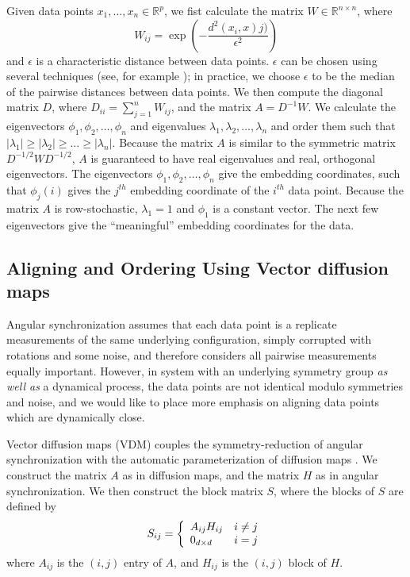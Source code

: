 \documentclass[12pt]{article}
\begin{document}
Given data points $x_1, \dots, x_n \in \mathbb{R}^p$, we fist calculate the matrix $W \in \mathbb{R}^{n \times n}$, where 
\begin{equation}
W_{ij} = \exp \left( -\frac{d^2(x_i, x)j)}{\epsilon^2} \right)
\end{equation}
and $\epsilon$ is a characteristic distance between data points.
%
$\epsilon$ can be chosen using several techniques (see, for example \cite{coifman2008graph}); in practice, we choose $\epsilon$ to be the median of the pairwise distances between data points.
%
We then compute the diagonal matrix $D$, where $D_{ii} = \sum_{j=1}^{n} W_{ij}$, and the matrix $A = D^{-1} W$. 
%
We calculate the eigenvectors $\phi_1, \phi_2, \dots, \phi_n$ and eigenvalues $\lambda_1, \lambda_2, \dots, \lambda_n$ and order them such that $|\lambda_1| \ge |\lambda_2| \ge \dots \ge |\lambda_n|$. 
%
Because the matrix $A$ is similar to the symmetric matrix $D^{-1/2} W D^{-1/2}$, $A$ is guaranteed to have real eigenvalues and real, orthogonal eigenvectors. 
%
The eigenvectors $\phi_1, \phi_2, \dots, \phi_n$ give the embedding coordinates, such that $\phi_j(i)$ gives the $j^{th}$ embedding coordinate of the $i^{th}$ data point. 
%
Because the matrix $A$ is row-stochastic, $\lambda_1=1$ and $\phi_1$ is a constant vector.
%
The next few eigenvectors give the ``meaningful'' embedding coordinates for the data. 

\subsection{Aligning and Ordering Using Vector diffusion maps} 

Angular synchronization assumes that each data point is a replicate measurements of the same underlying configuration, simply corrupted with rotations and some noise, and therefore considers all pairwise measurements equally important.
%
However, in system with an underlying symmetry group {\em as well as} a dynamical process, the data points are not identical modulo symmetries and noise, and we would like to place more emphasis on aligning data points which are dynamically close.

Vector diffusion maps (VDM) couples the symmetry-reduction of angular synchronization with the automatic parameterization of diffusion maps \cite{singer2012vector}. 
%
We construct the matrix $A$ as in diffusion maps, and the matrix $H$ as in angular synchronization.
%
We then construct the block matrix $S$, where the blocks of $S$ are defined by
\begin{equation}
S_{ij} = \left\{ \begin{array}{l l} 
A_{ij} H_{ij} & i \ne j \\
0_{d \times d} & i = j
\end{array}
\right.
\end{equation}
%
where $A_{ij}$ is the $(i,j)$ entry of $A$, and $H_{ij}$ is the $(i,j)$ block of $H$. 
\end{document}
